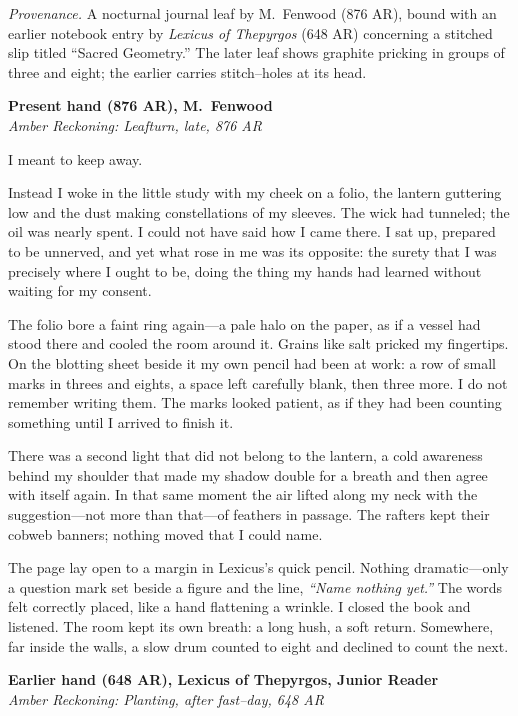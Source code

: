 \documentclass[11pt]{article}
\numberwithin{equation}{section} %
\theoremstyle{plain} %
\theoremstyle{definition} %
\theoremstyle{remark} %
\begin{document}
\noindent\textit{Provenance.} A nocturnal journal leaf by M.\ Fenwood (876 AR), bound with an earlier notebook entry by \textit{Lexicus of Thepyrgos} (648 AR) concerning a stitched slip titled ``Sacred Geometry.'' The later leaf shows graphite pricking in groups of three and eight; the earlier carries stitch--holes at its head.

\medskip
\noindent\textbf{Present hand (876 AR), M.\ Fenwood}\\
\noindent\textit{Amber Reckoning: Leafturn, late, 876 AR}

I meant to keep away.

Instead I woke in the little study with my cheek on a folio, the lantern guttering low and the dust making constellations of my sleeves. The wick had tunneled; the oil was nearly spent. I could not have said how I came there. I sat up, prepared to be unnerved, and yet what rose in me was its opposite: the surety that I was precisely where I ought to be, doing the thing my hands had learned without waiting for my consent.

The folio bore a faint ring again---a pale halo on the paper, as if a vessel had stood there and cooled the room around it. Grains like salt pricked my fingertips. On the blotting sheet beside it my own pencil had been at work: a row of small marks in threes and eights, a space left carefully blank, then three more. I do not remember writing them. The marks looked patient, as if they had been counting something until I arrived to finish it.

There was a second light that did not belong to the lantern, a cold awareness behind my shoulder that made my shadow double for a breath and then agree with itself again. In that same moment the air lifted along my neck with the suggestion---not more than that---of feathers in passage. The rafters kept their cobweb banners; nothing moved that I could name.

The page lay open to a margin in Lexicus's quick pencil. Nothing dramatic---only a question mark set beside a figure and the line, \emph{``Name nothing yet.''} The words felt correctly placed, like a hand flattening a wrinkle. I closed the book and listened. The room kept its own breath: a long hush, a soft return. Somewhere, far inside the walls, a slow drum counted to eight and declined to count the next.

\medskip
\noindent\textbf{Earlier hand (648 AR), Lexicus of Thepyrgos, Junior Reader}\\
\noindent\textit{Amber Reckoning: Planting, after fast--day, 648 AR}
\end{document}
